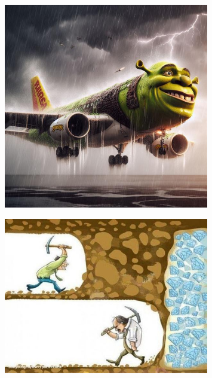 \documentclass[a4paper]{article}
\begin{document}
\begin{figure}[htbp]
\centering
\includegraphics[width=0.8\textwidth]{meme-shrek-plane.jpg}

\label{fig:meme-shrek-plane}
\end{figure}

\begin{figure}[htbp]
\centering
\includegraphics[width=0.8\textwidth]{meme-diamonds.jpg}

\label{fig:meme-diamonds}
\end{figure}
\end{document}
